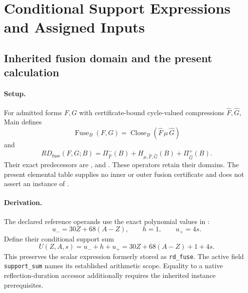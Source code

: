 \section{Conditional Support Expressions and Assigned Inputs}\label{sec:fusion-contact-ledger}

\subsection{Inherited fusion domain and the present calculation}\label{subsec:fusion-closure-derivation}
\paragraph{Setup.}
For admitted forms \(F,G\) with certificate-bound cycle-valued compressions \(\widehat F,\widehat G\), Main defines
\begin{equation}
\operatorname{Fuse}_B(F,G)
=\operatorname{Close}_B(\widehat F\,\mu\,\widehat G)
\label{eq:matter1-fusion-closure}
\end{equation}
and
\begin{equation}
RD_{\mathrm{fuse}}(F,G;B)
=\Pi^-_{\widehat F}(B)+H_{\mu,\widehat F,\widehat G}(B)+\Pi^+_{\widehat G}(B).
\label{eq:matter1-rd-fuse}
\end{equation}
Their exact predecessors are ,  and . These operators retain their domains. The present elemental table supplies no inner or outer fusion certificate and does not assert an instance of .

\paragraph{Derivation.}
The declared reference operands use the exact polynomial values in :
\begin{equation}
u_-=30Z+68(A-Z),\qquad h=1,\qquad u_+=4s.
\label{eq:matter1-rung-operands}
\end{equation}
Define their conditional support sum
\begin{equation}
U(Z,A,s)=u_-+h+u_+=30Z+68(A-Z)+1+4s.
\label{eq:matter1-support-sum}
\end{equation}
This preserves the scalar expression formerly stored as \texttt{rd\_fuse}. The active field \texttt{support\_sum} names its established arithmetic scope. Equality to a native reflection-duration accessor additionally requires the inherited instance prerequisites.

